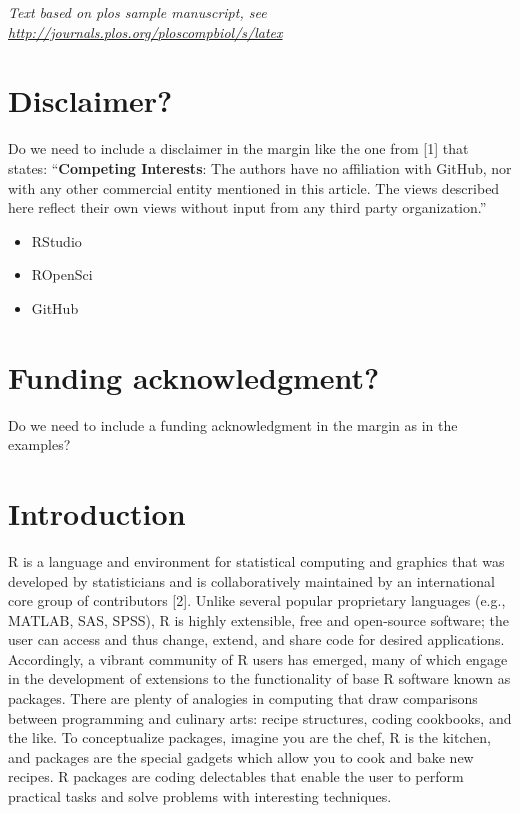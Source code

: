 \documentclass[10pt,letterpaper]{article}
\providecommand{\tightlist}{%
  \setlength{\itemsep}{0pt}\setlength{\parskip}{0pt}}
\begin{document}
\linenumbers

\emph{Text based on plos sample manuscript, see
\url{http://journals.plos.org/ploscompbiol/s/latex}}

\hypertarget{disclaimer}{%
\section{Disclaimer?}\label{disclaimer}}

Do we need to include a disclaimer in the margin like the one from
{[}1{]} that states: ``\textbf{Competing Interests}: The authors have no
affiliation with GitHub, nor with any other commercial entity mentioned
in this article. The views described here reflect their own views
without input from any third party organization.''

\begin{itemize}
\tightlist
\item
  RStudio
\item
  ROpenSci
\item
  GitHub
\end{itemize}

\hypertarget{funding-acknowledgment}{%
\section{Funding acknowledgment?}\label{funding-acknowledgment}}

Do we need to include a funding acknowledgment in the margin as in the
examples?

\hypertarget{introduction}{%
\section{Introduction}\label{introduction}}

R is a language and environment for statistical computing and graphics
that was developed by statisticians and is collaboratively maintained by
an international core group of contributors {[}2{]}. Unlike several
popular proprietary languages (e.g., MATLAB, SAS, SPSS), R is highly
extensible, free and open-source software; the user can access and thus
change, extend, and share code for desired applications. Accordingly, a
vibrant community of R users has emerged, many of which engage in the
development of extensions to the functionality of base R software known
as packages. There are plenty of analogies in computing that draw
comparisons between programming and culinary arts: recipe structures,
coding cookbooks, and the like. To conceptualize packages, imagine you
are the chef, R is the kitchen, and packages are the special gadgets
which allow you to cook and bake new recipes. R packages are coding
delectables that enable the user to perform practical tasks and solve
problems with interesting techniques.
\end{document}
